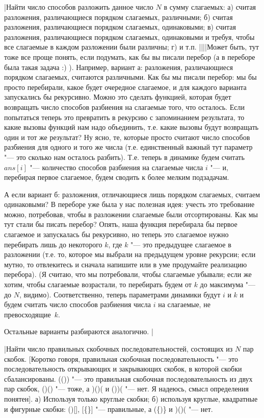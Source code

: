 \task|Найти число способов разложить данное число $N$ в сумму слагаемых: а) 
считая разложения, различающиеся порядком слагаемых, различными; б) считая разложения, 
различающиеся порядком слагаемых, одинаковыми; в) считая разложения, 
различающиеся порядком слагаемых, одинаковыми и требуя, чтобы все слагаемые 
в каждом разложении были различны; г) и т.п.
||||Может быть, тут тоже все проще понять, если подумать, как бы вы писали перебор (а в переборе была такая задача :) ). Например, вариант а: разложения, различающиеся порядком слагаемых, считаются различными. Как бы мы писали перебор: мы бы просто перебирали, какое будет очередное слагаемое, и для каждого варианта запускались бы рекурсивно. Можно это сделать функцией, которая будет возвращать число способов разбиения на слагаемые того, что осталось. Если попытаться теперь это превратить в рекурсию с запоминанием результата, то какие вызовы функций нам надо объединить, т.е. какие вызовы будут возвращать один и тот же результат? Ну ясно, те, которые просто считают число способов разбиения для одного и того же числа (т.е. единственный важный тут параметр "--- это сколько нам осталось разбить). Т.е. теперь в динамике будем считать $ans[i]$ "--- количество способов разбиения на слагаемые числа $i$ "--- и, перебирая первое слагаемое, будем сводить к более мелким подзадачам.

А если вариант б: разложения, отличающиеся лишь порядком слагаемых, считаем одинаковыми? В переборе уже была у нас полезная идея: учесть это требование можно, потребовав, чтобы в разложении слагаемые были отсортированы. Как мы тут стали бы писать перебор? Опять, наша функция перебирала бы первое слагаемое и запускалась бы рекурсивно, но теперь это слагаемое нужно перебирать лишь до некоторого $k$, где $k$ "--- это предыдущее слагаемое в разложении (т.е. то, которое мы выбрали на предыдущем уровне рекурсии; если мутно, то отвлекитесь и сначала напишите или в уме продумайте реализацию перебора). (Я считаю, что мы потребовали, чтобы слагаемые убывали; если же хотим, чтобы слагаемые возрастали, то перебирать будем от $k$ до максимума "--- до $N$, видимо). Соответственно, теперь параметрами динамики будут $i$ и $k$ и будем считать число способов разбиения числа $i$ на слагаемые, не превосходящие~$k$.

Остальные варианты разбираются аналогично.
|

\task|Найти число правильных скобочных последовательностей, состоящих из $N$ пар скобок. 
[Коротко говоря, правильная скобочная последовательность "--- это последовательность открывающих и 
закрывающих скобок, в которой скобки сбалансированы. (()) "--- это правильная скобочная 
последовательность из двух пар скобок, ()() "--- тоже, а )()( и ())( "--- нет. Я надеюсь, смысл 
определения понятен]. а) Используя только круглые скобки; б) используя круглые, квадратные и 
фигурные скобки: ()[], [\{\}] "--- правильные, а (\{)\} и )()( "--- нет.

